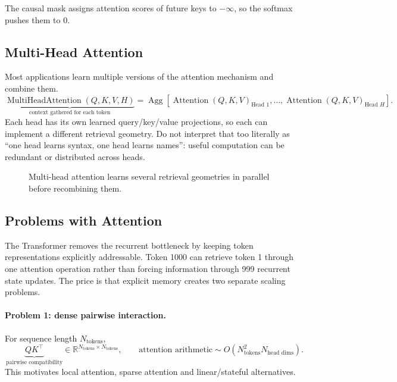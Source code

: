 \begin{calloutmemoryhook}
The causal mask assigns attention scores of future keys to $-\infty$, so the softmax pushes them to 0.
\end{calloutmemoryhook}

\subsection{Multi-Head Attention}
Most applications learn multiple versions of the attention mechanism and combine them.
\[
\underbrace{\operatorname{MultiHeadAttention}(Q,K,V,H)}_{\text{context gathered for each token}}
=
\operatorname{Agg}\!\left[
\operatorname{Attention}(Q,K,V)_{\text{Head 1}},\ldots,
\operatorname{Attention}(Q,K,V)_{\text{Head }H}
\right].
\]
Each head has its own learned query/key/value projections, so each can implement a different retrieval geometry.
Do not interpret that too literally as ``one head learns syntax, one head learns names'': useful computation can be redundant or distributed across heads.

\begin{figure}[htbp]
\centering
{}
\caption{Multi-head attention learns several retrieval geometries in parallel before recombining them.}
\label{fig:modern-multihead-attention}
\end{figure}

\subsection{Problems with Attention}
The Transformer removes the recurrent bottleneck by keeping token representations explicitly addressable.
Token 1000 can retrieve token 1 through one attention operation rather than forcing information through 999 recurrent state updates.
The price is that explicit memory creates two separate scaling problems.

\paragraph{Problem 1: dense pairwise interaction.}
For sequence length $N_{\text{tokens}}$,
\[
\underbrace{QK^\top}_{\text{pairwise compatibility}}
\in
\mathbb{R}^{N_{\text{tokens}}\times N_{\text{tokens}}},
\qquad
\text{attention arithmetic}
\sim
O\!\left(N_{\text{tokens}}^2N_{\text{head dims}}\right).
\]
This motivates local attention, sparse attention and linear/stateful alternatives.

